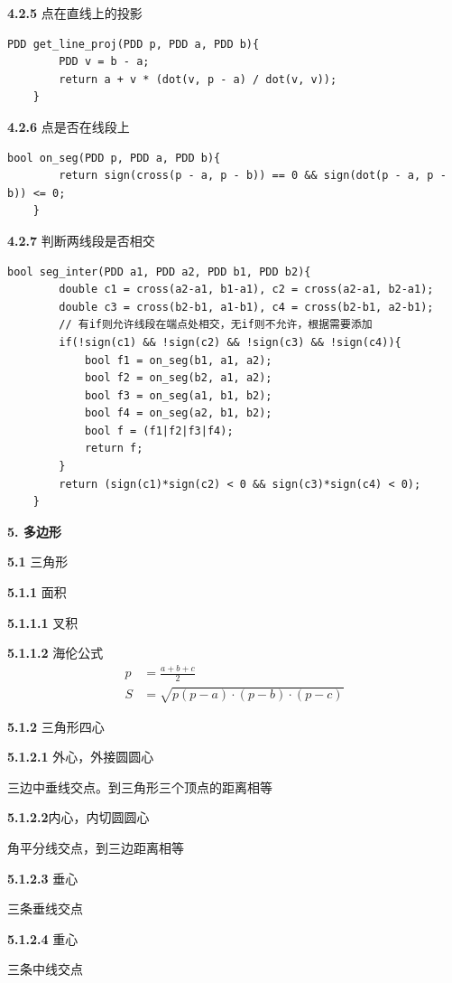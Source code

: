 \textbf{4.2.5} 点在直线上的投影

\begin{lstlisting}[style=C++]
	PDD get_line_proj(PDD p, PDD a, PDD b){
		PDD v = b - a;
		return a + v * (dot(v, p - a) / dot(v, v));
	}
\end{lstlisting}

\textbf{4.2.6} 点是否在线段上

\begin{lstlisting}[style=C++]
	bool on_seg(PDD p, PDD a, PDD b){
		return sign(cross(p - a, p - b)) == 0 && sign(dot(p - a, p - b)) <= 0;
	}
\end{lstlisting}

\textbf{4.2.7} 判断两线段是否相交

\begin{lstlisting}[style=C++]
	bool seg_inter(PDD a1, PDD a2, PDD b1, PDD b2){
		double c1 = cross(a2-a1, b1-a1), c2 = cross(a2-a1, b2-a1);
		double c3 = cross(b2-b1, a1-b1), c4 = cross(b2-b1, a2-b1);
		// 有if则允许线段在端点处相交，无if则不允许，根据需要添加
		if(!sign(c1) && !sign(c2) && !sign(c3) && !sign(c4)){
			bool f1 = on_seg(b1, a1, a2);
			bool f2 = on_seg(b2, a1, a2);
			bool f3 = on_seg(a1, b1, b2);
			bool f4 = on_seg(a2, b1, b2);
			bool f = (f1|f2|f3|f4);
			return f;
		}
		return (sign(c1)*sign(c2) < 0 && sign(c3)*sign(c4) < 0);
	}
\end{lstlisting}

\textbf{5. 多边形}

\textbf{5.1} 三角形

\textbf{5.1.1} 面积

\textbf{5.1.1.1} 叉积

\textbf{5.1.1.2} 海伦公式
$$
\begin{aligned}
	p &= \frac{a + b + c}{2}\\
	S &= \sqrt{p(p - a)\cdot(p - b)\cdot(p - c)}
\end{aligned}
$$

\textbf{5.1.2} 三角形四心

\textbf{5.1.2.1} 外心，外接圆圆心

三边中垂线交点。到三角形三个顶点的距离相等

\textbf{5.1.2.2}内心，内切圆圆心

角平分线交点，到三边距离相等

\textbf{5.1.2.3} 垂心

三条垂线交点

\textbf{5.1.2.4} 重心

三条中线交点

